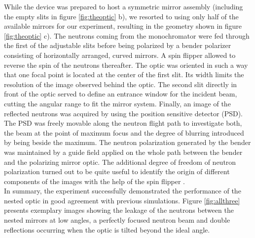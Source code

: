 \documentclass[12pt]{article}
\begin{document}
While the device was prepared to host a symmetric mirror assembly (including the empty slits in figure \ref{fig:theoptic} b), we resorted to using only half of the available mirrors for our experiment, resulting in the geometry shown in figure \ref{fig:theoptic} c). The neutrons coming from the monochromator were fed through the first of the adjustable slits before being polarized by a bender polarizer consisting of horizontally arranged, curved mirrors. A spin flipper allowed to reverse the spin of the neutrons thereafter. The optic was oriented in such a way that one focal point is located at the center of the first slit. Its width limits the resolution of the image observed behind the optic. The second slit directly in front of the optic served to define an entrance window for the incident beam, cutting the angular range to fit the mirror system.  Finally, an image of the reflected neutrons was acquired by using the position sensitive detector (PSD). The PSD was freely movable along the neutron flight path to investigate both, the beam at the point of maximum focus and the degree of blurring introduced by being beside the maximum. The neutron polarization generated by the bender was maintained by a guide field applied on the whole path between the bender and the polarizing mirror optic. The additional degree of freedom of neutron polarization turned out to be quite useful to identify the origin of different components of the images with the help of the spin flipper .\\
In summary, the experiment successfully demonstrated the performance of the nested optic in good agreement with previous simulations. Figure \ref{fig:allthree} presents exemplary images showing the leakage of the neutrons between the nested mirrors at low angles, a perfectly focused neutron beam and double reflections occurring when the optic is tilted beyond the ideal angle.
\end{document}
